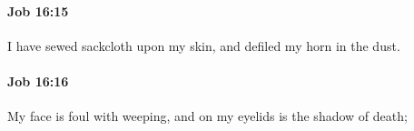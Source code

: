 		\paragraph{Job 16:15} %
			\label{JOB-16-15}

			I have sewed sackcloth upon my skin, and defiled my horn in the dust.


		\paragraph{Job 16:16} %
			\label{JOB-16-16}

			My face is foul with weeping, and on my eyelids is the shadow of death;


